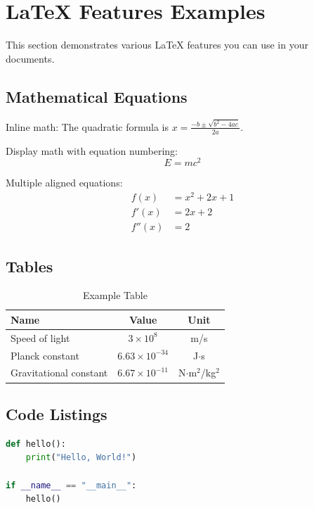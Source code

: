 \section{LaTeX Features Examples}

This section demonstrates various LaTeX features you can use in your documents.

\subsection{Mathematical Equations}

Inline math: The quadratic formula is $x = \frac{-b \pm \sqrt{b^2 - 4ac}}{2a}$.

Display math with equation numbering:
\begin{equation}
    E = mc^2
\end{equation}

Multiple aligned equations:
\begin{align}
    f(x) &= x^2 + 2x + 1 \\
    f'(x) &= 2x + 2 \\
    f''(x) &= 2
\end{align}

\subsection{Tables}

\begin{table}[H]
    \centering
    \caption{Example Table}
    \begin{tabular}{lcc}
        \toprule
        \textbf{Name} & \textbf{Value} & \textbf{Unit} \\
        \midrule
        Speed of light & $3 \times 10^8$ & m/s \\
        Planck constant & $6.63 \times 10^{-34}$ & J$\cdot$s \\
        Gravitational constant & $6.67 \times 10^{-11}$ & N$\cdot$m$^2$/kg$^2$ \\
        \bottomrule
    \end{tabular}
\end{table}

\subsection{Code Listings}

\begin{lstlisting}[language=Python, caption=Hello World in Python]
def hello():
    print("Hello, World!")

if __name__ == "__main__":
    hello()
\end{lstlisting}

